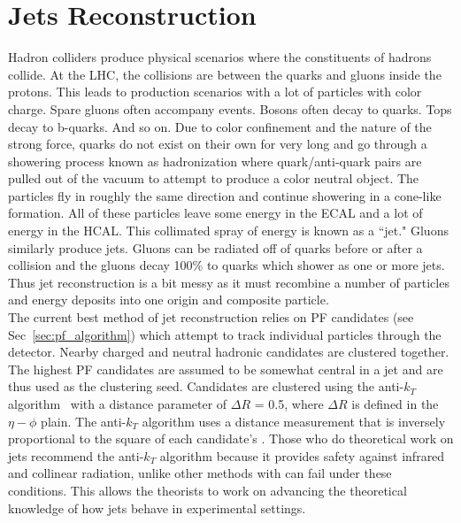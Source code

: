 	\section{Jets Reconstruction}
	Hadron colliders produce physical scenarios where the constituents of hadrons collide. At the LHC, the collisions are between the quarks and gluons inside the protons. This leads to production scenarios with a lot of particles with color charge. Spare gluons often accompany events. Bosons often decay to quarks. Tops decay to b-quarks. And so on. Due to color confinement and the nature of the strong force, quarks do not exist on their own for very long and go through a showering process known as hadronization where quark/anti-quark pairs are pulled out of the vacuum to attempt to produce a color neutral object. The particles fly in roughly the same direction and continue showering in a cone-like formation. All of these particles leave some energy in the ECAL and a lot of energy in the HCAL. This collimated spray of energy is known as a ``jet." Gluons similarly produce jets. Gluons can be radiated off of quarks before or after a collision and the gluons decay 100\% to quarks which shower as one or more jets. Thus jet reconstruction is a bit messy as it must recombine a number of particles and energy deposits into one origin and composite particle.\\
	
	The current best method of jet reconstruction relies on PF candidates (see Sec~\ref{sec:pf_algorithm}) which attempt to track individual particles through the detector. Nearby charged and neutral hadronic candidates are clustered together. The highest \pt PF candidates are assumed to be somewhat central in a jet and are thus used as the clustering seed. Candidates are clustered using the anti-$k_T$ algorithm~\cite{antikt} with a distance parameter of $\Delta R$ = 0.5, where $\Delta R$ is defined in the $\eta - \phi$ plain. The anti-$k_T$ algorithm uses a distance measurement that is inversely proportional to the square of each candidate's \pt. Those who do theoretical work on jets recommend the anti-$k_T$ algorithm because it provides safety against infrared and collinear radiation, unlike other methods with can fail under these conditions. This allows the theorists to work on advancing the theoretical knowledge of how jets behave in experimental settings.\\
	
